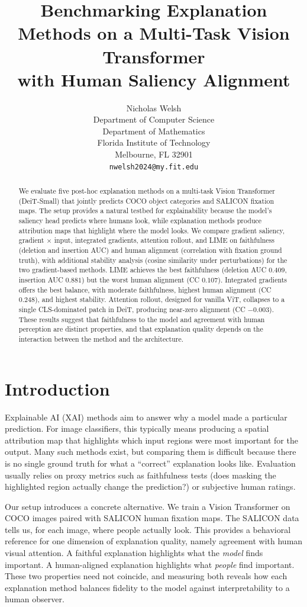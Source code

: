 \documentclass{article}
\title{Benchmarking Explanation Methods on a Multi-Task Vision Transformer\\with Human Saliency Alignment}
\author{%
 Nicholas Welsh \\
  Department of Computer Science\\
  Department of Mathematics \\
  Florida Institute of Technology\\
  Melbourne, FL 32901 \\
  \texttt{nwelsh2024@my.fit.edu}
}
\begin{document}
\maketitle

\begin{abstract}
We evaluate five post-hoc explanation methods on a multi-task Vision Transformer (DeiT-Small) that jointly predicts COCO object categories and SALICON fixation maps. The setup provides a natural testbed for explainability because the model's saliency head predicts where humans look, while explanation methods produce attribution maps that highlight where the model looks. We compare gradient saliency, gradient$\,\times\,$input, integrated gradients, attention rollout, and LIME on faithfulness (deletion and insertion AUC) and human alignment (correlation with fixation ground truth), with additional stability analysis (cosine similarity under perturbations) for the two gradient-based methods. LIME achieves the best faithfulness (deletion AUC $0.409$, insertion AUC $0.881$) but the worst human alignment (CC $0.107$). Integrated gradients offers the best balance, with moderate faithfulness, highest human alignment (CC $0.248$), and highest stability. Attention rollout, designed for vanilla ViT, collapses to a single CLS-dominated patch in DeiT, producing near-zero alignment (CC $-0.003$). These results suggest that faithfulness to the model and agreement with human perception are distinct properties, and that explanation quality depends on the interaction between the method and the architecture.
\end{abstract}

\section{Introduction}

Explainable AI (XAI) methods aim to answer why a model made a particular prediction. For image classifiers, this typically means producing a spatial attribution map that highlights which input regions were most important for the output. Many such methods exist, but comparing them is difficult because there is no single ground truth for what a ``correct'' explanation looks like. Evaluation usually relies on proxy metrics such as faithfulness tests (does masking the highlighted region actually change the prediction?) or subjective human ratings.

Our setup introduces a concrete alternative. We train a Vision Transformer on COCO images paired with SALICON human fixation maps. The SALICON data tells us, for each image, where people actually look. This provides a behavioral reference for one dimension of explanation quality, namely agreement with human visual attention. A faithful explanation highlights what the \emph{model} finds important. A human-aligned explanation highlights what \emph{people} find important. These two properties need not coincide, and measuring both reveals how each explanation method balances fidelity to the model against interpretability to a human observer.
\end{document}
